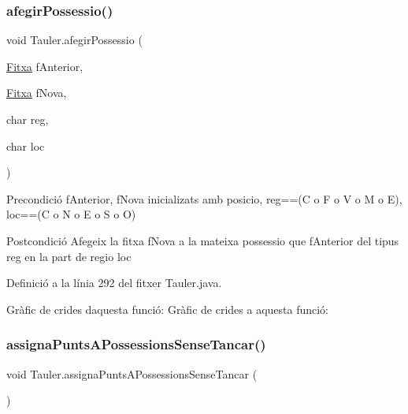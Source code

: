 \subsubsection{\texorpdfstring{afegir\+Possessio()}{afegirPossessio()}}
{\footnotesize\ttfamily void Tauler.\+afegir\+Possessio (\begin{DoxyParamCaption}\item[{\mbox{\hyperlink{class_fitxa}{Fitxa}}}]{f\+Anterior,  }\item[{\mbox{\hyperlink{class_fitxa}{Fitxa}}}]{f\+Nova,  }\item[{char}]{reg,  }\item[{char}]{loc }\end{DoxyParamCaption})\hspace{0.3cm}{\ttfamily [private]}}

\begin{DoxyPrecond}{Precondició}
f\+Anterior, f\+Nova inicializats amb posicio, reg==(\textquotesingle{}C\textquotesingle{} o \textquotesingle{}F\textquotesingle{} o \textquotesingle{}V\textquotesingle{} o \textquotesingle{}M\textquotesingle{} o \textquotesingle{}E\textquotesingle{}), loc==(\textquotesingle{}C\textquotesingle{} o \textquotesingle{}N\textquotesingle{} o \textquotesingle{}E\textquotesingle{} o \textquotesingle{}S\textquotesingle{} o \textquotesingle{}O\textquotesingle{}) 
\end{DoxyPrecond}
\begin{DoxyPostcond}{Postcondició}
Afegeix la fitxa f\+Nova a la mateixa possessio que f\+Anterior del tipus reg en la part de regio loc 
\end{DoxyPostcond}


Definició a la línia 292 del fitxer Tauler.\+java.

Gràfic de crides d\textquotesingle{}aquesta funció\+:
Gràfic de crides a aquesta funció\+:
\mbox{\label{class_tauler_aad088ac51b768b7c12b9a9862207f3fb}} 
\subsubsection{\texorpdfstring{assigna\+Punts\+A\+Possessions\+Sense\+Tancar()}{assignaPuntsAPossessionsSenseTancar()}}
{\footnotesize\ttfamily void Tauler.\+assigna\+Punts\+A\+Possessions\+Sense\+Tancar (\begin{DoxyParamCaption}{ }\end{DoxyParamCaption})}

